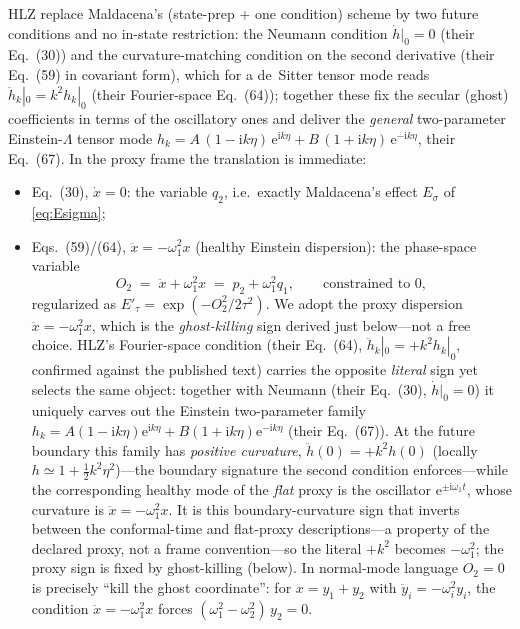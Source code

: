 \documentclass[11pt]{article}
\theoremstyle{definition}
\theoremstyle{remark}
\newcommand{\ii}{\mathrm{i}}
\newcommand{\ee}{\mathrm{e}}
\begin{document}
HLZ \cite{HLZ} replace Maldacena's (state-prep $+$ one condition)
scheme by two future conditions and no in-state restriction: the
Neumann condition $\dot h|_{0}=0$ (their Eq.~(30)) and the
curvature-matching condition on the second derivative (their
Eq.~(59) in covariant form), which for a de~Sitter tensor mode reads
$\ddot h_{k}|_{0}=k^{2}h_{k}|_{0}$ (their Fourier-space Eq.~(64));
together these fix the secular (ghost) coefficients in terms of the
oscillatory ones and deliver the \emph{general} two-parameter
Einstein-$\Lambda$ tensor mode
$h_{k}=A\,(1-\ii k\eta)\,\ee^{\ii k\eta}
+B\,(1+\ii k\eta)\,\ee^{-\ii k\eta}$, their Eq.~(67).
In the proxy frame the translation is immediate:
\begin{itemize}
\item Eq.~(30), $\dot x=0$: the variable $q_{2}$, i.e.\ exactly
Maldacena's effect $E_{\sigma}$ of \eqref{eq:Esigma};
\item Eqs.~(59)/(64), $\ddot x=-\omega_{1}^{2}x$ (healthy Einstein
dispersion): the phase-space variable
\begin{equation}
O_{2}\;=\;\ddot x+\omega_{1}^{2}x\;=\;p_{2}+\omega_{1}^{2}q_{1},
\qquad\text{constrained to }0,
\label{eq:O2}
\end{equation}
regularized as $E'_{\tau}=\exp(-O_{2}^{2}/2\tau^{2})$. We adopt the
proxy dispersion $\ddot x=-\omega_{1}^{2}x$, which is the
\emph{ghost-killing} sign derived just below---not a free choice.
HLZ's Fourier-space condition (their Eq.~(64),
$\ddot h_{k}|_{0}=+k^{2}h_{k}|_{0}$, confirmed against the published
text) carries the opposite \emph{literal} sign yet selects the same
object: together with Neumann (their Eq.~(30), $\dot h|_{0}=0$) it
uniquely carves out the Einstein two-parameter family
$h_{k}=A(1-\ii k\eta)\ee^{\ii k\eta}+B(1+\ii k\eta)\ee^{-\ii k\eta}$
(their Eq.~(67)). At the future boundary this family has \emph{positive
curvature}, $\ddot h(0)=+k^{2}h(0)$ (locally
$h\simeq1+\tfrac12 k^{2}\eta^{2}$)---the boundary signature the second
condition enforces---while the corresponding healthy mode of the
\emph{flat} proxy is the oscillator $\ee^{\pm\ii\omega_{1}t}$, whose
curvature is $\ddot x=-\omega_{1}^{2}x$. It is this boundary-curvature
sign that inverts between the conformal-time and flat-proxy
descriptions---a property of the declared proxy, not a frame
convention---so the literal $+k^{2}$ becomes $-\omega_{1}^{2}$; the
proxy sign is fixed by ghost-killing (below). In
normal-mode language $O_{2}=0$ is precisely ``kill the ghost
coordinate'': for $x=y_{1}+y_{2}$ with
$\ddot y_{i}=-\omega_{i}^{2}y_{i}$, the condition
$\ddot x=-\omega_{1}^{2}x$ forces
$(\omega_{1}^{2}-\omega_{2}^{2})\,y_{2}=0$.
\end{itemize}
\end{document}
